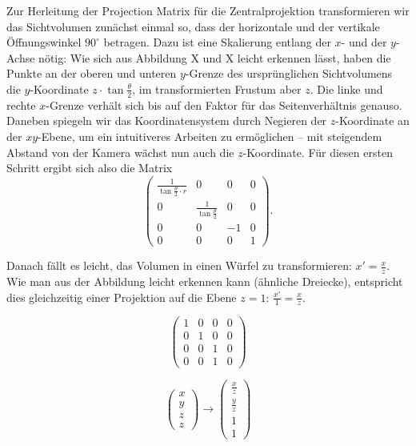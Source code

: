 Zur Herleitung der Projection Matrix für die Zentralprojektion transformieren wir das Sichtvolumen zunächst einmal so, dass der horizontale und der vertikale Öffnungswinkel $90^\circ$ betragen. Dazu ist eine Skalierung entlang der $x$- und der $y$-Achse nötig: Wie sich aus Abbildung X und X leicht erkennen lässt, haben die Punkte an der oberen und unteren $y$-Grenze des ursprünglichen Sichtvolumens die $y$-Koordinate $z \cdot \tan\frac{\theta}{2}$, im transformierten Frustum aber $z$. Die linke und rechte $x$-Grenze verhält sich bis auf den Faktor für das Seitenverhältnis genauso. Daneben spiegeln wir das Koordinatensystem durch Negieren der $z$-Koordinate an der $xy$-Ebene, um ein intuitiveres Arbeiten zu ermöglichen -- mit steigendem Abstand von der Kamera wächst nun auch die $z$-Koordinate. Für diesen ersten Schritt ergibt sich also die Matrix
\begin{equation}
 \begin{pmatrix}
  \frac{1}{\tan\frac{\theta}{2} \cdot r} & 0 & 0 & 0 \\
  0 & \frac{1}{\tan\frac{\theta}{2}} & 0 & 0 \\
  0 & 0 & -1 & 0 \\
  0 & 0 & 0 & 1
 \end{pmatrix}.
\end{equation}

Danach fällt es leicht, das Volumen in einen Würfel zu transformieren: $x' = \frac{x}{z}$. Wie man aus der Abbildung leicht erkennen kann (ähnliche Dreiecke), entspricht dies gleichzeitig einer Projektion auf die Ebene $z=1$: $\frac{x'}{1} = \frac{x}{z}$.

\begin{equation}
 \begin{pmatrix}
  1 & 0 & 0 & 0 \\
  0 & 1 & 0 & 0 \\
  0 & 0 & 1 & 0 \\
  0 & 0 & 1 & 0
 \end{pmatrix}
\end{equation}

\begin{equation}
 \begin{pmatrix}
  x \\
  y \\
  z \\
  z
 \end{pmatrix}
 \rightarrow
 \begin{pmatrix}
  \frac{x}{z} \\
  \frac{y}{z} \\
  1 \\
  1
 \end{pmatrix}
\end{equation}  


